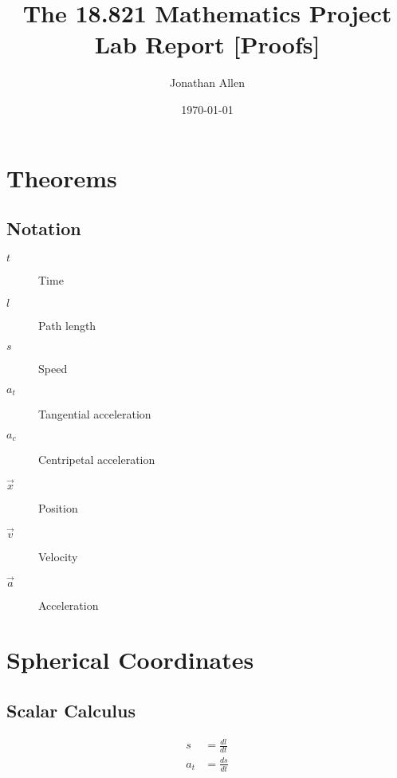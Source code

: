 \documentclass[12pt]{amsart}   %
\begin{document}
\title[The 18.821 report]{The 18.821 Mathematics Project Lab Report 
[Proofs]} 
 
\author{Jonathan Allen}
\date{\today}              %


\newcommand{\C}{\mathbb C} %
\newcommand{\R}{\mathbb R} 
\newcommand{\Z}{\mathbb Z}
\newcommand{\Q}{\mathbb Q}
\newcommand{\N}{\mathbb N}

\maketitle

\section{Theorems}

\subsection{Notation\label{sec:notation}} 

\begin{description}
    \item[$t$] Time
    \item[$l$] Path length
    \item[$s$] Speed
    \item[$a_t$] Tangential acceleration
    \item[$a_c$] Centripetal acceleration
    \item[$\vec{x}$] Position
    \item[$\vec{v}$] Velocity
    \item[$\vec{a}$] Acceleration
\end{description}

\section{Spherical Coordinates}

\subsection{Scalar Calculus}

\begin{align}
s& = \frac{dl}{dt}\\
%
a_t& = \frac{ds}{dt}\\
\end{align}
\end{document}
